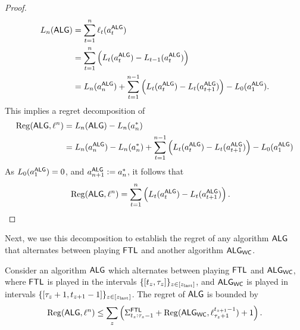 \begin{proof}
\begin{align}
L_n(\mathsf{ALG})
&= \sum_{t=1}^n \ell_t(a^{\mathsf{ALG}}_t) \\
&= \sum_{t=1}^n \left(L_t(a^{\mathsf{ALG}}_t) - L_{t-1}(a^{\mathsf{ALG}}_t) \right) \\
&= L_n(a^{\mathsf{ALG}}_n) + \sum_{t=1}^{n-1} \left(L_t(a^{\mathsf{ALG}}_t) - L_{t}(a^{\mathsf{ALG}}_{t+1}) \right) - L_0(a^{\mathsf{ALG}}_1).
\end{align}
This implies a regret decomposition of
\begin{align}
\mathrm{Reg}(\mathsf{ALG}, \ell^n)
&= L_n(\mathsf{ALG}) - L_n(a_n^*) \\
&= L_n(a^{\mathsf{ALG}}_n) - L_n(a_n^*) + \sum_{t=1}^{n-1} \left(L_t(a^{\mathsf{ALG}}_t) - L_{t}(a^{\mathsf{ALG}}_{t+1}) \right) - L_0(a^{\mathsf{ALG}}_1)
\end{align}
As $L_0(a^{\mathsf{ALG}}_1) = 0$, and $a_{n+1}^{\mathsf{ALG}} := a_n^*$, it follows that 
\begin{align}
\mathrm{Reg}(\mathsf{ALG}, \ell^n)
&= \sum_{t=1}^{n} \left(L_t(a^{\mathsf{ALG}}_t) - L_{t}(a^{\mathsf{ALG}}_{t+1}) \right).
\end{align}
\end{proof}

Next, we use this decomposition to establish the regret of any algorithm $\mathsf{ALG}$ that alternates between playing $\mathsf{FTL}$ and another algorithm $\mathsf{ALG}_{\mathsf{WC}}$.

\begin{lemma} \label{small_loss_regret_lemma}
Consider an algorithm $\mathsf{ALG}$ which alternates between playing $\mathsf{FTL}$ and $\mathsf{ALG}_{\mathsf{WC}}$, where $\mathsf{FTL}$ is played in the intervals $\{[t_z, \tau_z]\}_{z\in[z_{\mathrm{last}}]}$, and $\mathsf{ALG}_{\mathsf{WC}}$ is played in intervals $\{[\tau_z +1, t_{z+1}-1]\}_{z\in[z_{\mathrm{last}}]}$. The regret of $\mathsf{ALG}$ is bounded by
\begin{align}
\mathrm{Reg}(\mathsf{ALG}, \ell^n) \leq
\sum_z \left(\Sigma^{\mathsf{FTL}}_{t_z:\tau_z-1} + \mathrm{Reg}(\mathsf{ALG}_{\mathsf{WC}}, \ell_{\tau_z+1}^{t_{z+1}-1}) + 1\right).
\end{align}
\end{lemma}

